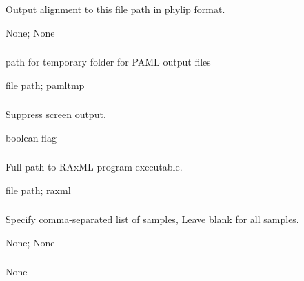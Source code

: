 \documentclass[letterpaper,11pt,english]{sphinxmanual}
\begin{document}
\subsubsection{}
\label{\detokenize{prog_desc:output-align-outputalign}}
 Output alignment to this file path in phylip format.

 None;  None


\subsubsection{}
\label{\detokenize{prog_desc:paml-tmp-pamltmp}}
 path for temporary folder for PAML output files

 file path;  pamltmp


\subsubsection{}
\label{\detokenize{prog_desc:id103}}
 Suppress screen output.

 boolean flag


\subsubsection{}
\label{\detokenize{prog_desc:raxml-path-raxmlpath}}
 Full path to RAxML program executable.

 file path;  raxml


\subsubsection{}
\label{\detokenize{prog_desc:id104}}
 Specify comma-separated list of samples, Leave blank for all samples.

 None;  None


\subsubsection{}
\label{\detokenize{prog_desc:species-groups-speciesgroups}}
 None
\end{document}
